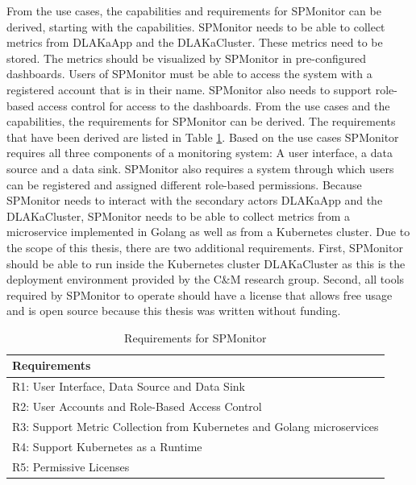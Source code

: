 From the use cases, the capabilities and requirements for SPMonitor can be
derived, starting with the capabilities. SPMonitor needs to be able to collect metrics
from DLAKaApp and the DLAKaCluster. These metrics need to be stored. The
metrics should be visualized by SPMonitor in pre-configured dashboards. Users
of SPMonitor must be able to access the system with a registered account that
is in their name. SPMonitor also needs to support role-based access control for
access to the dashboards. From the use cases and the capabilities, the
requirements for SPMonitor can be derived. The requirements that have been
derived are listed in Table \ref{tab:spmonitor_requirements}. Based on the use
cases SPMonitor requires all three components of a monitoring system: A user
interface, a data source and a data sink. SPMonitor also requires a system
through which users can be registered and assigned different role-based
permissions. Because SPMonitor needs to interact with the secondary actors
DLAKaApp and the DLAKaCluster, SPMonitor needs to be able to collect metrics
from a microservice implemented in Golang as well as from a Kubernetes cluster.
Due to the scope of this thesis, there are two additional requirements. First,
SPMonitor should be able to run inside the Kubernetes cluster DLAKaCluster as this
is the deployment environment provided by the C\&M research group.
Second, all tools required by SPMonitor to operate should have a license that
allows free usage and is open source because this thesis was written without funding.

\begin{table}[]
  \centering
  \begin{tabular}{l}
    Requirements                                                           \\
    \hline
    R1: User Interface, Data Source and Data Sink                          \\
    R2: User Accounts and Role-Based Access Control                        \\
    R3: Support Metric Collection from Kubernetes and Golang microservices \\
    R4: Support Kubernetes as a Runtime                                    \\
    R5: Permissive Licenses                                                \\
  \end{tabular}
  \caption{Requirements for SPMonitor}
  \label{tab:spmonitor_requirements}
\end{table}

